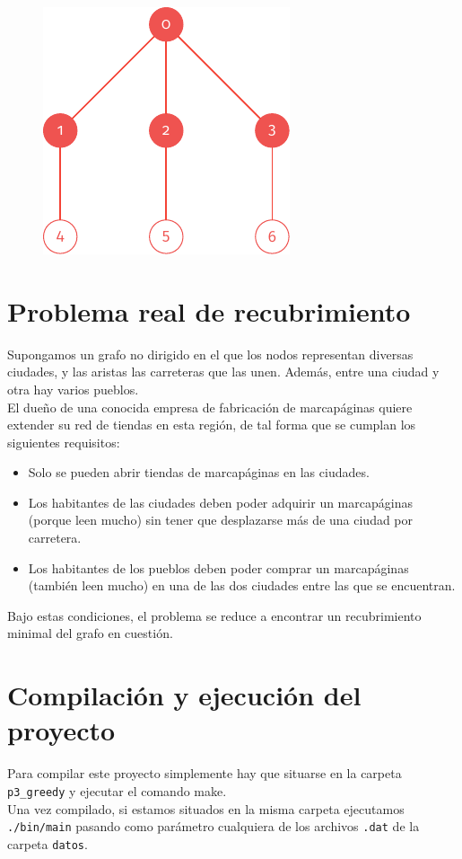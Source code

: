 \documentclass[11pt]{article}
\begin{document}
\begin{figure}[H]
	\centering \includegraphics{./img/grafo2-no-minimal.pdf}
\end{figure}

\section*{Problema real de recubrimiento}

Supongamos un grafo no dirigido en el que los nodos representan diversas ciudades, y las aristas las carreteras que las unen. Además, entre una ciudad y otra hay varios pueblos.\\

El dueño de una conocida empresa de fabricación de marcapáginas quiere extender su red de tiendas en esta región, de tal forma que se cumplan los siguientes requisitos:

\begin{itemize}
    \item Solo se pueden abrir tiendas de marcapáginas en las ciudades.
	\item Los habitantes de las ciudades deben poder adquirir un marcapáginas (porque leen mucho) sin tener que desplazarse más de una ciudad por carretera.
	 \item Los habitantes de los pueblos deben poder comprar un marcapáginas (también leen mucho) en una de las dos ciudades entre las que se encuentran.
\end{itemize}

Bajo estas condiciones, el problema se reduce a encontrar un recubrimiento minimal del grafo en cuestión.

\section*{Compilación y ejecución del proyecto}
Para compilar este proyecto simplemente hay que situarse en la carpeta \verb|p3_greedy| y ejecutar el comando make.\\

Una vez compilado, si estamos situados en la misma carpeta ejecutamos \verb|./bin/main| pasando como parámetro cualquiera de los archivos \verb|.dat| de la carpeta \verb|datos|.
\end{document}
